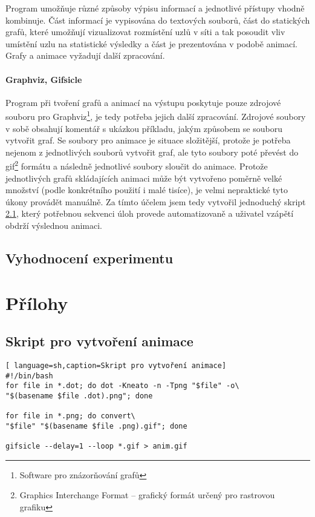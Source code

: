 \documentclass[11pt,final,twoside]{fithesis2}
\begin{document}
Program umožňuje různé způsoby výpisu informací a jednotlivé přístupy vhodně kombinuje. Část informací je vypisována do textových souborů, část do statických grafů, které umožňují vizualizovat 
rozmístění uzlů v síti a tak posoudit vliv umístění uzlu na statistické výsledky a část je prezentována v podobě animací. Grafy a animace vyžadují další zpracování.

\subsubsection{Graphviz, Gifsicle}

Program při tvoření grafů a animací na výstupu poskytuje pouze zdrojové souboru pro Graphviz\footnote{Software pro znázorňování grafů}, je tedy potřeba jejich další zpracování. Zdrojové soubory 
v sobě obsahují komentář s ukázkou příkladu, jakým způsobem se souboru vytvořit graf. Se soubory pro animace je situace složitější, protože je potřeba nejenom z jednotlivých souborů vytvořit graf, ale 
tyto soubory poté převést do gif\footnote{Graphics Interchange Format --  grafický formát určený pro rastrovou grafiku} formátu a následně jednotlivé soubory sloučit do animace. Protože jednotlivých
grafů skládajících animaci může být vytvořeno poměrně velké množství (podle konkrétního použití i malé tisíce), je velmi nepraktické tyto úkony provádět manuálně. Za tímto účelem jsem tedy vytvořil 
jednoduchý skript \ref{sec:script}, který potřebnou sekvenci úloh provede automatizovaně a uživatel vzápětí obdrží výslednou animaci. 

\section{Vyhodnocení experimentu}




\appendix

\chapter{Přílohy}

\section{Skript pro vytvoření animace}\label{sec:script}
\begin{lstlisting}[ language=sh,caption=Skript pro vytvoření animace]
#!/bin/bash
for file in *.dot; do dot -Kneato -n -Tpng "$file" -o\
"$(basename $file .dot).png"; done

for file in *.png; do convert\
"$file" "$(basename $file .png).gif"; done

gifsicle --delay=1 --loop *.gif > anim.gif

\end{lstlisting}
\end{document}
